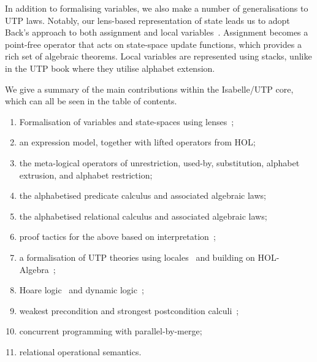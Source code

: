 \documentclass[11pt,a4paper]{article}
\begin{document}
In addition to formalising variables, we also make a number of generalisations to UTP laws. Notably, our lens-based
representation of state leads us to adopt Back's approach to both assignment and local
variables~\cite{Back1998}. Assignment becomes a point-free operator that acts on state-space update functions, which
provides a rich set of algebraic theorems. Local variables are represented using stacks, unlike in the UTP book where
they utilise alphabet extension.

\pagebreak

We give a summary of the main contributions within the Isabelle/UTP core, which can all be seen in the table of
contents.

\begin{enumerate}
  \item Formalisation of variables and state-spaces using lenses~\cite{Foster16a};
  \item an expression model, together with lifted operators from HOL;
  \item the meta-logical operators of unrestriction, used-by, substitution, alphabet extrusion, and alphabet restriction;
  \item the alphabetised predicate calculus and associated algebraic laws;
  \item the alphabetised relational calculus and associated algebraic laws;
  \item proof tactics for the above based on interpretation~\cite{Huffman13};
  \item a formalisation of UTP theories using locales~\cite{Ballarin06} and building on HOL-Algebra~\cite{Ballarin17};
  \item Hoare logic~\cite{Hoare1969-Logic} and dynamic logic~\cite{Harel1984-DynamicLogic};
  \item weakest precondition and strongest postcondition calculi~\cite{Dijkstra75};
  \item concurrent programming with parallel-by-merge;
  \item relational operational semantics.
\end{enumerate}





\end{document}
